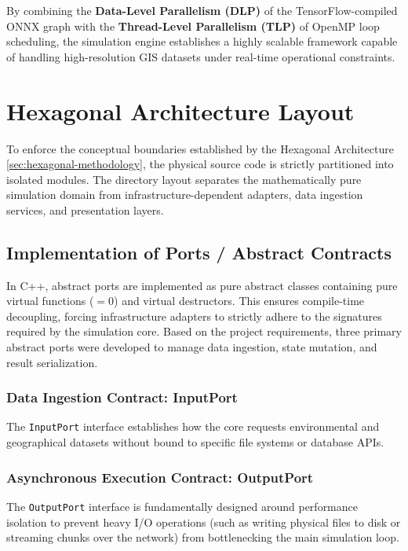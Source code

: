By combining the \textbf{Data-Level Parallelism (DLP)} of the TensorFlow-compiled ONNX graph with the 
\textbf{Thread-Level Parallelism (TLP)} of OpenMP loop scheduling, the simulation engine establishes a highly scalable framework capable of 
handling high-resolution GIS datasets under real-time operational constraints.


\section{Hexagonal Architecture Layout}

To enforce the conceptual boundaries established by the Hexagonal Architecture \ref{sec:hexagonal-methodology}, the physical source 
code is strictly partitioned into isolated modules. The directory layout separates the mathematically pure simulation domain from 
infrastructure-dependent adapters, data ingestion services, and presentation layers.


\subsection{Implementation of Ports / Abstract Contracts}
\label{subsec:implementation_ports}

In C++, abstract ports are implemented as pure abstract classes containing pure virtual functions ($=0$) and virtual destructors. 
This ensures compile-time decoupling, forcing infrastructure adapters to strictly adhere to the signatures required by the simulation 
core. Based on the project requirements, three primary abstract ports were developed to manage data ingestion, state mutation, and 
result serialization.

\subsubsection{Data Ingestion Contract: InputPort}

The \texttt{InputPort} interface establishes how the core requests environmental and geographical datasets without bound to specific 
file systems or database APIs. 

\subsubsection{Asynchronous Execution Contract: OutputPort}

The \texttt{OutputPort} interface is fundamentally designed around performance isolation to prevent heavy I/O operations (such as 
writing physical files to disk or streaming chunks over the network) from bottlenecking the main simulation loop.

